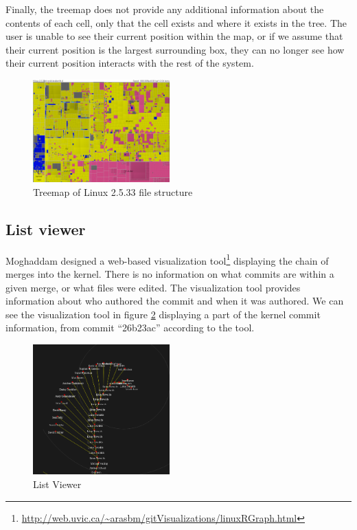 \documentclass[conference, draftclsnofoot]{IEEEtran}
\begin{document}
Finally, the treemap does not provide any additional information about the
contents of each cell, only that the cell exists and where it exists in the
tree. The user is unable to see their current position within the map, or if we
assume that their current position is the largest surrounding box, they can
no longer see how their current position interacts with the rest of the
system.

\begin{figure}[h]
	\centering
	\includegraphics[width=0.47\textwidth]{figures/kernel-files.png}
	\caption{Treemap of Linux 2.5.33 file structure}
	\label{fig:treemap}
\end{figure}

\subsection{List viewer}
Moghaddam designed a web-based visualization
tool\footnote{\url{http://web.uvic.ca/~arasbm/gitVisualizations/linuxRGraph.html}}
displaying the chain of merges into the kernel. There is no information on what
commits are within a given merge, or what files were edited. The visualization
tool provides information about who authored the commit and when it was
authored. We can see the visualization tool in figure \ref{fig:listviewer}
displaying a part of the kernel commit information, from commit ``26b23ac''
according to the tool.


\begin{figure}[h]
	\centering
	\includegraphics[width=0.47\textwidth]{figures/gitvis.png}
	\caption{List Viewer}
	\label{fig:listviewer}
\end{figure}
\end{document}
